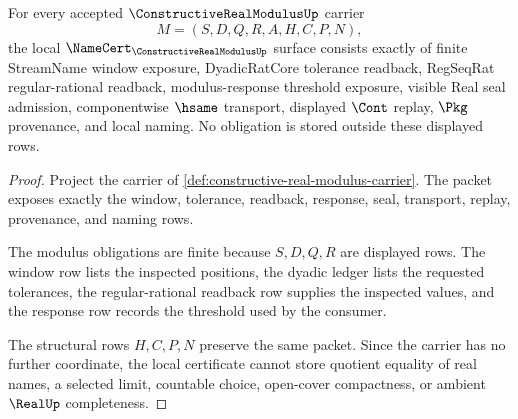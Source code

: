 \begin{theorem}
\label{thm:constructive-real-modulus-namecert-obligations}
For every accepted $\ConstructiveRealModulusUp$ carrier
$$
M=(S,D,Q,R,A,H,C,P,N),
$$
the local $\NameCert_{\ConstructiveRealModulusUp}$ surface consists exactly of
finite StreamName window exposure, DyadicRatCore tolerance readback, RegSeqRat
regular-rational readback, modulus-response threshold exposure, visible Real
seal admission, componentwise $\hsame$ transport, displayed $\Cont$ replay,
$\Pkg$ provenance, and local naming. No obligation is stored outside these
displayed rows.
\end{theorem}
\begin{proof}
Project the carrier of \autoref{def:constructive-real-modulus-carrier}. The
packet exposes exactly the window, tolerance, readback, response, seal,
transport, replay, provenance, and naming rows.

The modulus obligations are finite because $S,D,Q,R$ are displayed rows. The
window row lists the inspected positions, the dyadic ledger lists the requested
tolerances, the regular-rational readback row supplies the inspected values,
and the response row records the threshold used by the consumer.

The structural rows $H,C,P,N$ preserve the same packet. Since the carrier has no
further coordinate, the local certificate cannot store quotient equality of real
names, a selected limit, countable choice, open-cover compactness, or ambient
$\RealUp$ completeness.
\end{proof}

